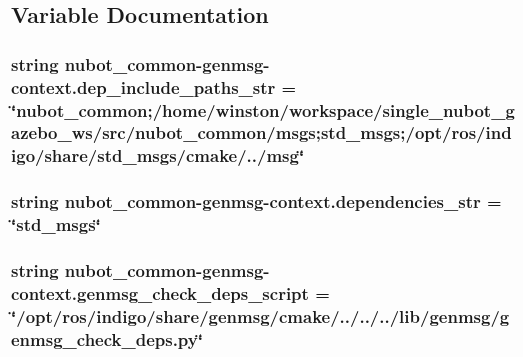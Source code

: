 \subsection{Variable Documentation}
\hypertarget{namespacenubot__common-genmsg-context_a3cb8468ce84e82ac5e2b66290f260f4c}{
\subsubsection[{dep\-\_\-include\-\_\-paths\-\_\-str}]{\setlength{\rightskip}{0pt plus 5cm}string nubot\-\_\-common-\/genmsg-\/context.\-dep\-\_\-include\-\_\-paths\-\_\-str = \char`\"{}nubot\-\_\-common;/home/winston/workspace/single\-\_\-nubot\-\_\-gazebo\-\_\-ws/src/nubot\-\_\-common/msgs;std\-\_\-msgs;/opt/ros/indigo/share/std\-\_\-msgs/cmake/../msg\char`\"{}}}\label{namespacenubot__common-genmsg-context_a3cb8468ce84e82ac5e2b66290f260f4c}
\hypertarget{namespacenubot__common-genmsg-context_acb3057b57eb9458421378baa13f383d0}{
\subsubsection[{dependencies\-\_\-str}]{\setlength{\rightskip}{0pt plus 5cm}string nubot\-\_\-common-\/genmsg-\/context.\-dependencies\-\_\-str = \char`\"{}std\-\_\-msgs\char`\"{}}}\label{namespacenubot__common-genmsg-context_acb3057b57eb9458421378baa13f383d0}
\hypertarget{namespacenubot__common-genmsg-context_a32a0523eb31dd66d816b3d32bd6aa2b5}{
\subsubsection[{genmsg\-\_\-check\-\_\-deps\-\_\-script}]{\setlength{\rightskip}{0pt plus 5cm}string nubot\-\_\-common-\/genmsg-\/context.\-genmsg\-\_\-check\-\_\-deps\-\_\-script = \char`\"{}/opt/ros/indigo/share/genmsg/cmake/../../../lib/genmsg/genmsg\-\_\-check\-\_\-deps.\-py\char`\"{}}}\label{namespacenubot__common-genmsg-context_a32a0523eb31dd66d816b3d32bd6aa2b5}
